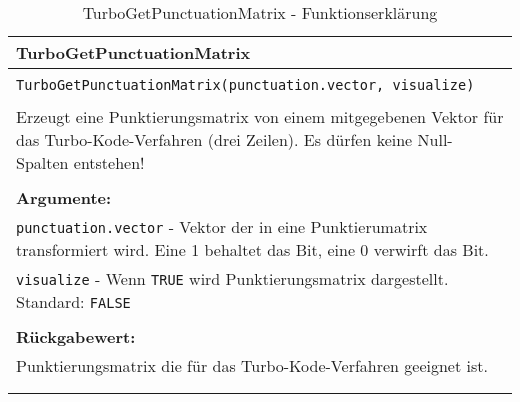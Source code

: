 \begin{longtable}{|p{\textwidth}|}
\hline
\rowcolor{lightblue}TurboGetPunctuationMatrix\\
\hline
\\
\texttt{TurboGetPunctuationMatrix(punctuation.vector, visualize)}\\
\\
Erzeugt eine Punktierungsmatrix von einem mitgegebenen Vektor für das Turbo-Kode-Verfahren (drei Zeilen). Es dürfen keine Null-Spalten entstehen!\\
\\
\textbf{Argumente:}\\
\texttt{punctuation.vector} - Vektor der in eine Punktierumatrix transformiert wird. Eine 1 behaltet das Bit, eine 0 verwirft das Bit.\\
\texttt{visualize} - Wenn \texttt{TRUE} wird Punktierungsmatrix dargestellt. Standard: \texttt{FALSE}\\
\\
\textbf{Rückgabewert:}\\
Punktierungsmatrix die für das Turbo-Kode-Verfahren geeignet ist.\\
\\
\hline
\caption[TurboGetPunctuationMatrix]{TurboGetPunctuationMatrix - Funktionserklärung}
\end{longtable}